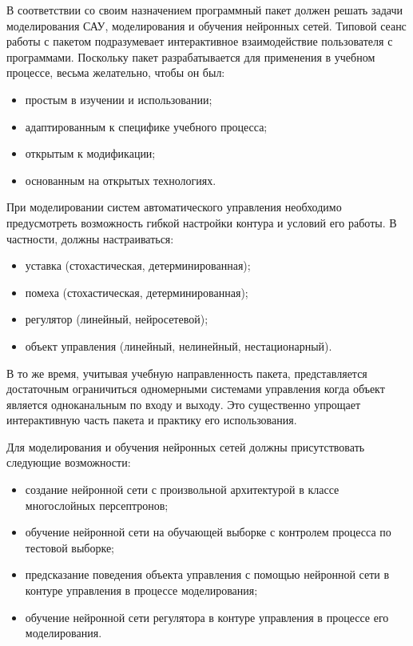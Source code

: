 В соответствии со своим назначением программный пакет должен решать
задачи моделирования САУ, моделирования и обучения нейронных сетей.
Типовой сеанс работы с пакетом подразумевает интерактивное
взаимодействие пользователя с программами.  Поскольку пакет
разрабатывается для применения в учебном процессе, весьма желательно,
чтобы он был:
\begin{itemize}
\item простым в изучении и использовании;
\item адаптированным к специфике учебного процесса;
\item открытым к модификации;
\item основанным на открытых технологиях.
\end{itemize}

При моделировании систем автоматического управления необходимо
предусмотреть возможность гибкой настройки контура и условий его
работы.  В частности, должны настраиваться:
\begin{itemize}
\item уставка (стохастическая, детерминированная);
\item помеха (стохастическая, детерминированная);
\item регулятор (линейный, нейросетевой);
\item объект управления (линейный, нелинейный, нестационарный).
\end{itemize}

В то же время, учитывая учебную направленность пакета, представляется
достаточным ограничиться одномерными системами управления когда объект
является одноканальным по входу и выходу.  Это существенно упрощает
интерактивную часть пакета и практику его использования.

Для моделирования и обучения нейронных сетей должны присутствовать
следующие возможности:
\begin{itemize}
\item создание нейронной сети с произвольной архитектурой в классе
  многослойных персептронов;
\item обучение нейронной сети на обучающей выборке с контролем
  процесса по тестовой выборке;
\item предсказание поведения объекта управления с помощью нейронной
  сети в контуре управления в процессе моделирования;
\item обучение нейронной сети регулятора в контуре управления в
  процессе его моделирования.
\end{itemize}

